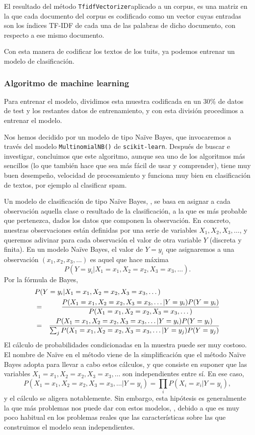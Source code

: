 El resultado del método {\tt TfidfVectorizer}aplicado a un corpus, 
es una matriz en la que cada documento
del corpus es codificado como un vector cuyas entradas son los índices TF-IDF de cada
una de las palabras de dicho documento, con respecto a ese mismo documento.

Con esta manera de codificar los textos de los tuits, ya podemos entrenar un modelo 
de clasificación.

\subsubsection{Algoritmo de machine learning}
Para entrenar el modelo, dividimos esta muestra codificada en un $30$\% de datos de test y los restantes datos de entrenamiento,
y con esta división procedimos a entrenar el modelo.

Nos hemos decidido por un modelo de tipo Naïve Bayes, que 
invocaremos a través del modelo {\tt MultinomialNB()} de {\tt  scikit-learn}. Después de buscar e investigar, concluimos que este algoritmo,  aunque sea uno de los algoritmos más sencillos (lo que también hace que sea más fácil de usar y comprender), tiene muy buen desempeño, velocidad de procesamiento y funciona muy bien en clasificación de textos, por ejemplo al clasificar spam.

Un modelo de clasificación de tipo Naïve Bayes, \cite{notas_antonio}, se basa en asignar
a cada observación aquella clase o resultado de la clasificación, a la que es más probable que
pertenezca, dados los datos que componen la observación. En concreto, nuestras observaciones
están definidas por una serie de variables $X_1, X_2, X_3,\dots$, y queremos adivinar para cada
observación el valor de otra variable $Y$ (discreta y finita).
En un modelo Naïve Bayes, el valor de $Y=y_i$ 
que asignaremos a una observación $(x_1, x_2,x_3,\dots)$ es aquel que hace máxima
$$P(Y=y_i|X_1=x_1,X_2=x_2,X_3=x_3,\dots).$$
Por la fórmula de Bayes,
\begin{eqnarray*}
\lefteqn{P(Y=y_i|X_1=x_1,X_2=x_2,X_3=x_3,\dots)}\\
 &=& \frac{P(X_1=x_1,X_2=x_2,X_3=x_3,\dots|Y=y_i)P(Y=y_i)}
{P(X_1=x_1,X_2=x_2,X_3=x_3,\dots)}\\
&=&\frac{P(X_1=x_1,X_2=x_2,X_3=x_3,\dots|Y=y_i)P(Y=y_i)}
{\sum_jP(X_1=x_1,X_2=x_2,X_3=x_3,\dots|Y=y_j)P(Y=y_j)}
\end{eqnarray*}
El cálculo de probabilidades condicionadas en la muestra puede ser muy costoso. El nombre 
de Naïve en el método viene de la simplificación que el método Naïve Bayes adopta para
llevar a cabo estos cálculos, y que consiste en suponer que 
las variables  $X_1=x_1,X_2=x_2,X_3=x_3,\dots$
son independientes entre sí. En ese caso, 
$$P(X_1=x_1,X_2=x_2,X_3=x_3,\dots|Y=y_i) = \prod_i P(X_i=x_i|Y=y_i),$$
y el cálculo se aligera notablemente. Sin embargo, esta hipótesis es generalmente la que más
problemas nos puede dar con estos modelos, \cite{nltk_book}, debido a que es muy poco habitual
en los problemas reales que las características sobre las que construimos el modelo sean 
independientes.

